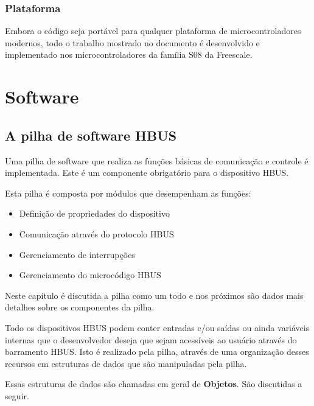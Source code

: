 \documentclass[11pt]{report}
\begin{document}
\section{Plataforma}

Embora o código seja portável para qualquer plataforma de microcontroladores modernos, todo o trabalho mostrado no documento é desenvolvido e implementado nos microcontroladores da família S08 da Freescale.

\part{Software}

\chapter{A pilha de software HBUS}

Uma pilha de software que realiza as funções básicas de comunicação e controle é implementada. Este é um componente obrigatório para o dispositivo HBUS.

Esta pilha é composta por módulos que desempenham as funções:

\begin{itemize}

\item Definição de propriedades do dispositivo
\item Comunicação através do protocolo HBUS
\item Gerenciamento de interrupções
\item Gerenciamento do microcódigo HBUS

\end{itemize}

Neste capítulo é discutida a pilha como um todo e nos próximos são dados mais detalhes sobre os componentes da pilha.

Todo os dispositivos HBUS podem conter entradas e/ou saídas ou ainda variáveis internas que o desenvolvedor deseja que sejam acessíveis ao usuário através do barramento HBUS. Isto é realizado pela pilha, através de uma organização desses recursos em estruturas de dados que são manipuladas pela pilha.

Essas estruturas de dados são chamadas em geral de \textbf{Objetos}. São discutidas a seguir.

\newcommand{\tstrcommunication}{Protocolo de \\ Comunicação}
\newcommand{\tstrobjects}{Objetos}
\newcommand{\tstrucode}{Microcódigo}
\newcommand{\tstrhbusstack}{Pilha HBUS}
\newcommand{\tstrhbusdevice}{Dispositivo HBUS}
\newcommand{\tstrdevicecode}{Código do dispositivo (firmware)}
\end{document}
